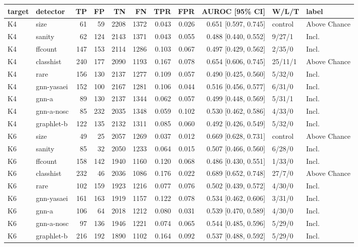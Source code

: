 \begin{tabular}{@{}llrrrrrrrll@{}}
\toprule
target & detector & TP & FP & TN & FN & TPR & FPR & AUROC [95\% CI] & W/L/T & label \\
\midrule
K4 & size & 61 & 59 & 2208 & 1372 & 0.043 & 0.026 & 0.651 [0.597, 0.745] & control & Above Chance \\
K4 & sanity & 62 & 124 & 2143 & 1371 & 0.043 & 0.055 & 0.488 [0.440, 0.552] & 9/27/1 & Incl. \\
K4 & ffcount & 147 & 153 & 2114 & 1286 & 0.103 & 0.067 & 0.497 [0.429, 0.562] & 2/35/0 & Incl. \\
K4 & classhist & 240 & 177 & 2090 & 1193 & 0.167 & 0.078 & 0.654 [0.606, 0.745] & 25/11/1 & Above Chance \\
K4 & rare & 156 & 130 & 2137 & 1277 & 0.109 & 0.057 & 0.490 [0.425, 0.560] & 5/32/0 & Incl. \\
K4 & gnn-yasaei & 152 & 100 & 2167 & 1281 & 0.106 & 0.044 & 0.516 [0.456, 0.577] & 6/31/0 & Incl. \\
K4 & gnn-a & 89 & 130 & 2137 & 1344 & 0.062 & 0.057 & 0.499 [0.448, 0.569] & 5/31/1 & Incl. \\
K4 & gnn-a-nosc & 85 & 232 & 2035 & 1348 & 0.059 & 0.102 & 0.530 [0.462, 0.586] & 4/33/0 & Incl. \\
K4 & graphlet-b & 122 & 135 & 2132 & 1311 & 0.085 & 0.060 & 0.492 [0.426, 0.549] & 5/32/0 & Incl. \\
\midrule
K6 & size & 49 & 25 & 2057 & 1269 & 0.037 & 0.012 & 0.669 [0.628, 0.731] & control & Above Chance \\
K6 & sanity & 85 & 32 & 2050 & 1233 & 0.064 & 0.015 & 0.507 [0.466, 0.560] & 6/28/0 & Incl. \\
K6 & ffcount & 158 & 142 & 1940 & 1160 & 0.120 & 0.068 & 0.486 [0.430, 0.551] & 1/33/0 & Incl. \\
K6 & classhist & 232 & 46 & 2036 & 1086 & 0.176 & 0.022 & 0.689 [0.652, 0.748] & 27/7/0 & Above Chance \\
K6 & rare & 102 & 159 & 1923 & 1216 & 0.077 & 0.076 & 0.502 [0.439, 0.572] & 4/30/0 & Incl. \\
K6 & gnn-yasaei & 161 & 163 & 1919 & 1157 & 0.122 & 0.078 & 0.534 [0.462, 0.606] & 3/31/0 & Incl. \\
K6 & gnn-a & 106 & 64 & 2018 & 1212 & 0.080 & 0.031 & 0.539 [0.470, 0.589] & 4/30/0 & Incl. \\
K6 & gnn-a-nosc & 97 & 136 & 1946 & 1221 & 0.074 & 0.065 & 0.544 [0.485, 0.596] & 5/29/0 & Incl. \\
K6 & graphlet-b & 216 & 192 & 1890 & 1102 & 0.164 & 0.092 & 0.537 [0.488, 0.592] & 5/29/0 & Incl. \\

\end{tabular}

